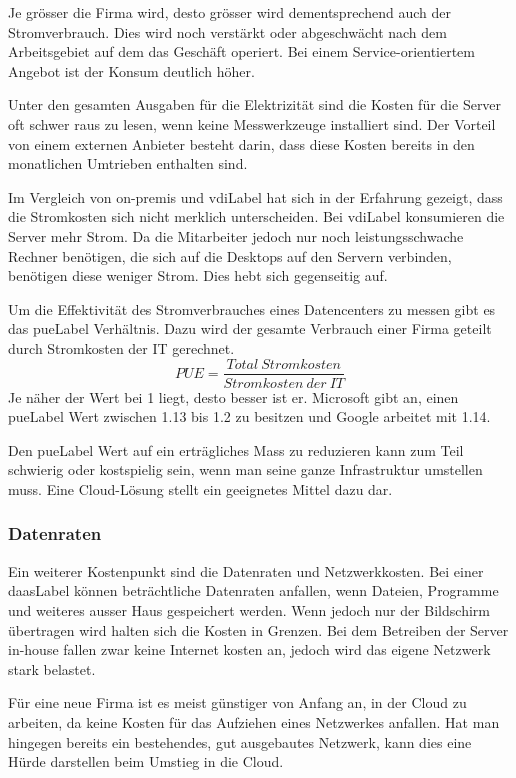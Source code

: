 Je grösser die Firma wird, desto grösser wird dementsprechend auch der Stromverbrauch. Dies wird noch verstärkt oder abgeschwächt nach dem Arbeitsgebiet auf dem das Geschäft operiert. Bei einem Service-orientiertem Angebot ist der Konsum deutlich höher.

Unter den gesamten Ausgaben für die Elektrizität sind die Kosten für die Server oft schwer raus zu lesen, wenn keine Messwerkzeuge installiert sind. Der Vorteil von einem externen Anbieter besteht darin, dass diese Kosten bereits in den monatlichen Umtrieben enthalten sind.

Im Vergleich von on-premis und \Gls{vdiLabel} hat sich in der Erfahrung gezeigt, dass die Stromkosten sich nicht merklich unterscheiden. Bei \Gls{vdiLabel} konsumieren die Server mehr Strom. Da die Mitarbeiter jedoch nur noch leistungsschwache Rechner benötigen, die sich auf die Desktops auf den Servern verbinden, benötigen diese weniger Strom. Dies hebt sich gegenseitig auf.

Um die Effektivität des Stromverbrauches eines Datencenters zu messen gibt es das \Gls{pueLabel} Verhältnis. Dazu wird der gesamte Verbrauch einer Firma geteilt durch Stromkosten der IT gerechnet.
\[PUE = \frac{Total\: Stromkosten}{Stromkosten\: der\: IT}\]
Je näher der Wert bei 1 liegt, desto besser ist er. Microsoft gibt an, einen \Gls{pueLabel} Wert zwischen 1.13 bis 1.2 zu besitzen und Google arbeitet mit 1.14.

Den \Gls{pueLabel} Wert auf ein erträgliches Mass zu reduzieren kann zum Teil schwierig oder kostspielig sein, wenn man seine ganze Infrastruktur umstellen muss. Eine Cloud-Lösung stellt ein geeignetes Mittel dazu dar.

\subsubsection{Datenraten}
Ein weiterer Kostenpunkt sind die Datenraten und Netzwerkkosten. Bei einer \Gls{daasLabel} können beträchtliche Datenraten anfallen, wenn Dateien, Programme und weiteres ausser Haus gespeichert werden. Wenn jedoch nur der Bildschirm übertragen wird halten sich die Kosten in Grenzen. Bei dem Betreiben der Server in-house fallen zwar keine Internet kosten an, jedoch wird das eigene Netzwerk stark belastet.

Für eine neue Firma ist es meist günstiger von Anfang an, in der Cloud zu arbeiten, da keine Kosten für das Aufziehen eines Netzwerkes anfallen.
Hat man hingegen bereits ein bestehendes, gut ausgebautes Netzwerk, kann dies eine Hürde darstellen beim Umstieg in die Cloud.

